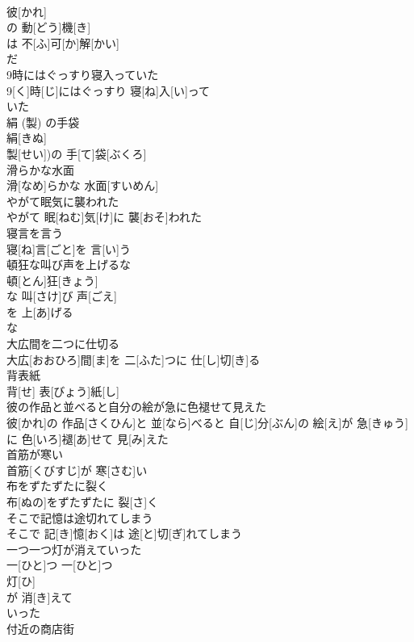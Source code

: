 \documentclass[8pt]{extreport}
\begin{document}
\begin{CJK}{UTF8}{min}
\\	彼[かれ]
\\	の 動[どう]機[き]
\\	は 不[ふ]可[か]解[かい]
\\	だ
\\	9時にはぐっすり寝入っていた	
\\	9[く]時[じ]にはぐっすり 寝[ね]入[い]って 
\\	いた
\\	絹 (製) の手袋	
\\	絹[きぬ]
\\	製[せい])の 手[て]袋[ぶくろ]
\\	滑らかな水面	
\\	滑[なめ]らかな 水面[すいめん]
\\	やがて眠気に襲われた	
\\	やがて 眠[ねむ]気[け]に 襲[おそ]われた
\\	寝言を言う	
\\	寝[ね]言[ごと]を 言[い]う
\\	頓狂な叫び声を上げるな	
\\	頓[とん]狂[きょう]
\\	な 叫[さけ]び 声[ごえ]
\\	を 上[あ]げる 
\\	な
\\	大広間を二つに仕切る	
\\	大広[おおひろ]間[ま]を 二[ふた]つに 仕[し]切[き]る
\\	背表紙	
\\	背[せ] 表[びょう]紙[し]
\\	彼の作品と並べると自分の絵が急に色褪せて見えた	
\\	彼[かれ]の 作品[さくひん]と 並[なら]べると 自[じ]分[ぶん]の 絵[え]が 急[きゅう]に 色[いろ]褪[あ]せて 見[み]えた
\\	首筋が寒い	
\\	首筋[くびすじ]が 寒[さむ]い
\\	布をずたずたに裂く	
\\	布[ぬの]をずたずたに 裂[さ]く
\\	そこで記憶は途切れてしまう	
\\	そこで 記[き]憶[おく]は 途[と]切[ぎ]れてしまう
\\	一つ一つ灯が消えていった	
\\	一[ひと]つ 一[ひと]つ 
\\	灯[ひ]
\\	が 消[き]えて 
\\	いった
\\	付近の商店街	

\end{CJK}
\end{document}
